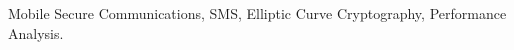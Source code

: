 \documentclass[authoryear]{elsarticle}
\begin{document}
\begin{frontmatter}
\begin{abstract}
%  
%
%

\end{abstract}

\begin{keyword}
Mobile Secure Communications, SMS, Elliptic Curve Cryptography, Performance Analysis.
\end{keyword}

\end{frontmatter}
\end{document}

